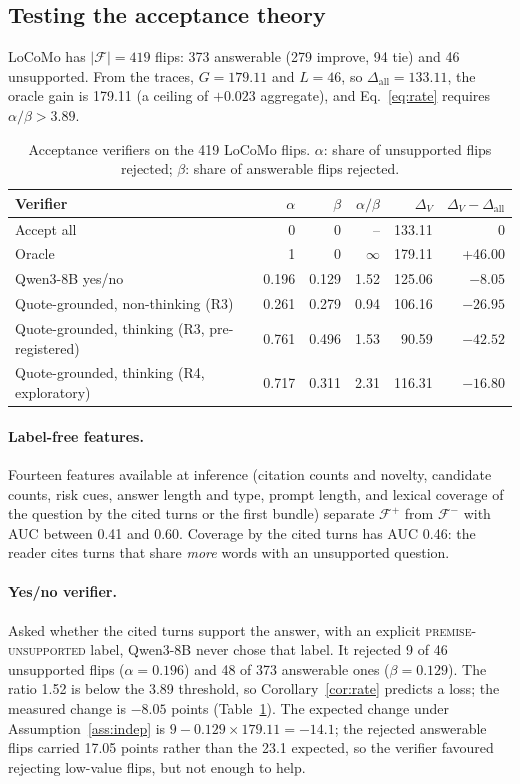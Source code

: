 \documentclass[10pt]{article}
\theoremstyle{plain}
\theoremstyle{definition}
\theoremstyle{remark}
\newcommand{\F}{\mathcal{F}}
\begin{document}
\subsection{Testing the acceptance theory}

LoCoMo has $|\F|=419$ flips: 373 answerable (279 improve, 94 tie) and 46
unsupported. From the traces, $G=179.11$ and $L=46$, so $\Delta_{\mathrm{all}}=133.11$,
the oracle gain is 179.11 (a ceiling of $+0.023$ aggregate), and Eq.~\eqref{eq:rate}
requires $\alpha/\beta>3.89$.

\begin{table}[t]
\centering
\caption{Acceptance verifiers on the 419 LoCoMo flips. $\alpha$: share of
unsupported flips rejected; $\beta$: share of answerable flips rejected.}
\label{tab:verify}
\small
\begin{tabular}{lrrrrr}
\toprule
Verifier & $\alpha$ & $\beta$ & $\alpha/\beta$ & $\Delta_V$ & $\Delta_V-\Delta_{\mathrm{all}}$ \\
\midrule
Accept all & 0 & 0 & -- & 133.11 & 0 \\
Oracle & 1 & 0 & $\infty$ & 179.11 & +46.00 \\
Qwen3-8B yes/no & 0.196 & 0.129 & 1.52 & 125.06 & $-8.05$ \\
Quote-grounded, non-thinking (R3) & 0.261 & 0.279 & 0.94 & 106.16 & $-26.95$ \\
Quote-grounded, thinking (R3, pre-registered) & 0.761 & 0.496 & 1.53 & 90.59 & $-42.52$ \\
Quote-grounded, thinking (R4, exploratory) & 0.717 & 0.311 & 2.31 & 116.31 & $-16.80$ \\
\bottomrule
\end{tabular}
\end{table}

\paragraph{Label-free features.}
Fourteen features available at inference (citation counts and novelty, candidate
counts, risk cues, answer length and type, prompt length, and lexical coverage of
the question by the cited turns or the first bundle) separate $\F^+$ from $\F^-$
with AUC between 0.41 and 0.60. Coverage by the cited turns has AUC 0.46: the reader
cites turns that share \emph{more} words with an unsupported question.

\paragraph{Yes/no verifier.}
Asked whether the cited turns support the answer, with an explicit
\textsc{premise-unsupported} label, Qwen3-8B never chose that label. It rejected
9 of 46 unsupported flips ($\alpha=0.196$) and 48 of 373 answerable ones
($\beta=0.129$). The ratio 1.52 is below the 3.89 threshold, so
Corollary~\ref{cor:rate} predicts a loss; the measured change is $-8.05$ points
(Table~\ref{tab:verify}). The expected change under Assumption~\ref{ass:indep} is $9-0.129\times179.11=-14.1$;
the rejected answerable flips carried 17.05 points rather than the 23.1 expected,
so the verifier favoured rejecting low-value flips, but not enough to help.
\end{document}
